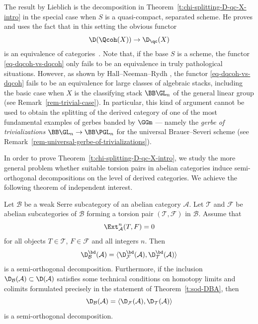 The result by Lieblich is the decomposition in Theorem~\ref{t:chi-splitting-D-qc-X-intro}
in the special case when $S$ is a quasi-compact, separated scheme.
He proves and uses the fact that in this setting the obvious functor
\begin{equation}
\label{eq-dqcoh-vs-dqcoh}
\D(\Qcoh(X)) \to \D_\qc(X)
\end{equation}
is an equivalence of categories~\cite[Proposition~2.2.4.6]{lieblich2004}.
Note that, if the base $S$ is a scheme, the functor \eqref{eq-dqcoh-vs-dqcoh} only fails to be an equivalence
in truly pathological situations.
However, as shown by Hall--Neeman--Rydh \cite[Theorem~1.3]{hnr2018},
the functor \eqref{eq-dqcoh-vs-dqcoh} fails to be an equivalence for large classes of algebraic stacks,
including the basic case when $X$ is the classifying stack $\BB \GL_n$ of the general linear group
(see Remark~\ref{rem-trivial-case}).
In particular, this kind of argument cannot be used to obtain the splitting of the derived category
of one of the most fundamental examples of gerbes banded by $\GGm$ ---
namely the \emph{gerbe of trivializations}
$\BB \GL_n \to \BB \PGL_n$ for the universal Brauer--Severi scheme
(see Remark~\ref{rem-universal-gerbe-of-trivializations}).

In order to prove Theorem~\ref{t:chi-splitting-D-qc-X-intro},
we study the more general problem whether suitable torsion pairs in abelian categories induce
semi-orthogonal decompositions on the level of derived categories.
We achieve the following theorem of independent interest.

\begin{mtheorem}
  \label{t:sod-DBA-intro}
  Let $\mathcal{B}$ be a weak Serre subcategory of an abelian
  category $\mathcal{A}$.
  Let 
  $\mathcal{T}$ and
  $\mathcal{F}$ be abelian subcategories of $\mathcal{B}$
  forming a torsion pair $(\mathcal{T}, \mathcal{F})$ in
  $\mathcal{B}$.
  Assume that 
  \begin{equation*}
    \Ext^n_{\mathcal{A}}(T, F)=0
  \end{equation*}
  for all objects $T \in \mathcal{T}$, $F \in \mathcal{F}$ and
  all integers $n$. 
  Then 
  \begin{equation*}
    \D_{\mathcal{B}}^\bd(\mathcal{A})=
    \langle \D_{\mathcal{F}}^\bd(\mathcal{A}), 
    \D_{\mathcal{T}}^\bd(\mathcal{A})\rangle
  \end{equation*}
  is a semi-orthogonal decomposition.
  Furthermore, if the inclusion $\D_{\mathcal{B}}(\mathcal{A})
  \subset \D(\mathcal{A})$ 
  satisfies some technical
  conditions on homotopy limits and colimits
  formulated precisely in the statement of Theorem~\ref{t:sod-DBA},
  then
  \begin{equation*}
    \D_{\mathcal{B}}(\mathcal{A})=
    \langle \D_{\mathcal{F}}(\mathcal{A}), 
    \D_{\mathcal{T}}(\mathcal{A})\rangle
  \end{equation*}
  is a semi-orthogonal decomposition.
\end{mtheorem}

